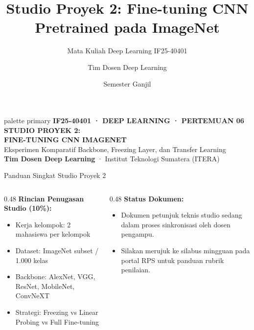 \documentclass[aspectratio=169,10pt]{beamer}
\title[Pertemuan 06: Studio Proyek 2 (ImageNet)]{Studio Proyek 2: Fine-tuning CNN Pretrained pada ImageNet}
\subtitle{Mata Kuliah Deep Learning IF25-40401}
\author{Tim Dosen Deep Learning}
\institute{Teknik Informatika — Institut Teknologi Sumatera (ITERA)}
\date{Semester Ganjil}
\begin{document}
\begin{frame}[plain]
  \begin{beamercolorbox}[wd=\paperwidth,ht=\paperheight,sep=1.5cm]{palette primary}
    \vspace{0.8cm}
    {\scriptsize\bfseries\color{dlMute}IF25-40401 · DEEP LEARNING · PERTEMUAN 06}\\[0.4cm]
    {\Huge\bfseries STUDIO PROYEK 2:\\FINE-TUNING CNN IMAGENET}\\[0.4cm]
    {\small Eksperimen Komparatif Backbone, Freezing Layer, dan Transfer Learning}\\[1.0cm]
    \vfill
    {\scriptsize\textbf{Tim Dosen Deep Learning} · Institut Teknologi Sumatera (ITERA)}
  \end{beamercolorbox}
\end{frame}

\begin{frame}{Panduan Singkat Studio Proyek 2}
  \begin{columns}[t]
    \begin{column}{0.48\textwidth}
      \textbf{Rincian Penugasan Studio (10\%):}
      \begin{itemize}
        \item Kerja kelompok: 2 mahasiswa per kelompok
        \item Dataset: ImageNet subset / 1.000 kelas
        \item Backbone: AlexNet, VGG, ResNet, MobileNet, ConvNeXT
        \item Strategi: Freezing vs Linear Probing vs Full Fine-tuning
      \end{itemize}
    \end{column}
    \begin{column}{0.48\textwidth}
      \textbf{Status Dokumen:}
      \begin{itemize}
        \item Dokumen petunjuk teknis studio sedang dalam proses sinkronisasi oleh dosen pengampu.
        \item Silakan merujuk ke silabus mingguan pada portal RPS untuk panduan rubrik penilaian.
      \end{itemize}
    \end{column}
  \end{columns}
\end{frame}
\end{document}
